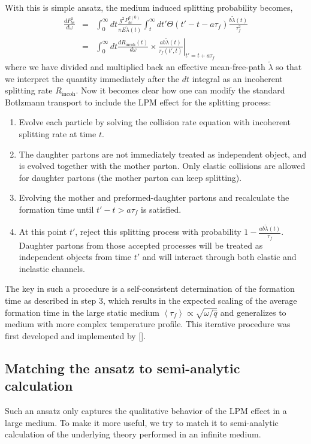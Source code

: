 \documentclass[aps, prc, reprint, amsmath, groupedaddress, nofootinbib]{revtex4-1}
\begin{document}
With this is simple ansatz, the medium induced splitting probability becomes,
\begin{eqnarray}
\frac{dP^{a}_{bc}}{d\omega} &=& \int_0^\infty dt \frac{g^2 P_{bc}^{a(0)}}{\pi E\tilde{\lambda}(t)} \int_t^\infty dt'  \Theta(t'-t-a\tau_f) \frac{b \tilde{\lambda}(t)}{\tau_f^2} \\
&=& \int_0^\infty dt \frac{dR_{\textrm{incoh}}(t)}{d\omega} \times \left.\frac{ab\tilde{\lambda}(t)}{\tau_f(t',t)}\right|_{t'=t+a\tau_f}
\end{eqnarray}
where we have divided and multiplied back an effective mean-free-path $\tilde{\lambda}$ so that we interpret the quantity immediately after the $dt$ integral as an incoherent splitting rate $R_{\textrm{incoh}}$.
Now it becomes clear how one can modify the standard Botlzmann transport to include the LPM effect for the splitting process:
\begin{enumerate}
\item Evolve each particle by solving the collision rate equation with incoherent splitting rate at time $t$.
\item The daughter partons are not immediately treated as independent object, and is evolved together with the mother parton. Only elastic collisions are allowed for daughter partons (the mother parton can keep splitting).
\item Evolving the mother and preformed-daughter partons and recalculate the formation time until $t'-t > a\tau_f$ is satisfied.
\item At this point $t'$, reject this splitting process with probability $1-\frac{ab\tilde{\lambda}(t)}{\tau_f}$. Daughter partons from those accepted processes will be treated as independent objects from time $t'$ and will interact through both elastic and inelastic channels.
\end{enumerate} 
The key in such a procedure is a self-consistent determination of the formation time as described in step 3, which results in the expected scaling of the average formation time in the large static medium $\left\langle\tau_f\right\rangle \propto \sqrt{\omega/\hat{q}}$ and generalizes to medium with more complex temperature profile.
This iterative procedure was first developed and implemented by [].

\subsection{Matching the ansatz to semi-analytic calculation}
Such an ansatz only captures the qualitative behavior of the LPM effect in a large medium. 
To make it more useful, we try to match it to semi-analytic calculation of the underlying theory performed in an infinite medium.
\end{document}
